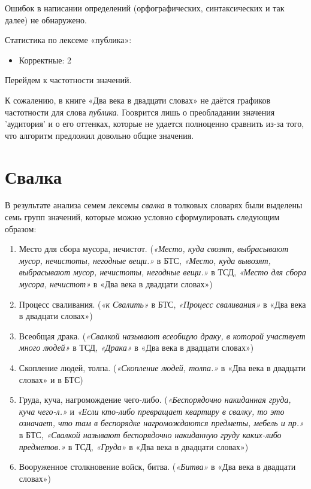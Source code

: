 Ошибок в написании определений (орфографических, синтаксических и так далее) не обнаружено.

Статистика по лексеме «публика»:

\begin{itemize}
    \item Корректные: 2
\end{itemize}

Перейдем к частотности значений.

К сожалению, в книге «Два века в двадцати словах» не даётся
графиков частотности для слова \textit{публика}.
Гооврится лишь о преобладании значения ’аудитория’ и о его оттенках,
которые не удается полноценно сравнить из-за того, что алгоритм предложил довольно общие значения.

\section*{Свалка}

В результате анализа семем лексемы \textit{свалка} в толковых словарях были
выделены семь групп значений, которые можно условно сформулировать
следующим образом:

\begin{enumerate}
    \item Место для сбора мусора, нечистот.
(\textit{«Место, куда свозят, выбрасывают мусор, нечистоты, негодные вещи.»} в БТС,
\textit{«Место, куда вывозят, выбрасывают мусор, нечистоты, негодные вещи.»} в ТСД,
\textit{«Место для сбора мусора, нечистот»} в «Два века в двадцати словах»)
    \item Процесс сваливания.
(\textit{«к Свалить»} в БТС,
\textit{«Процесс сваливания»} в «Два века в двадцати словах»)
    \item Всеобщая драка.
(\textit{«Свалкой называют всеобщую драку, в которой участвует много людей»} в ТСД,
\textit{«Драка»} в «Два века в двадцати словах»)
    \item Скопление людей, толпа.
(\textit{«Скопление людей, толпа.»} в «Два века в двадцати словах» и в БТС)
    \item Груда, куча, нагромождение чего-либо.
(\textit{«Беспорядочно накиданная груда, куча чего-л.»} и
\textit{«Если кто-либо превращает квартиру в свалку, то это означает, что там в беспорядке нагромождаются предметы, мебель и пр.»} в БТС,
\textit{«Свалкой называют беспорядочно накиданную груду каких-либо предметов.»} в ТСД,
\textit{«Груда»} в «Два века в двадцати словах»)
    \item Вооруженное столкновение войск, битва.
(\textit{«Битва»} в «Два века в двадцати словах»)
\end{enumerate}

